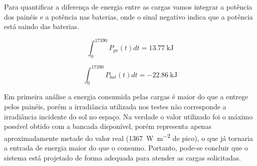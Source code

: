 Para quantificar a diferença de energia entre as cargas vamos integrar a potência dos painéis e a potência nas baterias, onde o sinal negativo indica que a potência está saindo das baterias.

\begin{equation}
\int_{0}^{17390} P_{pv}(t) dt = \SI{13.77}{\kilo\joule}
\end{equation} 

\begin{equation}
\int_{0}^{17390} P_{bat}(t) dt = \SI{-22.86}{\kilo\joule}
\end{equation}

Em primeira análise a energia consumida pelas cargas é maior do que a entrege pelos painéis, porém a irradiância utilizada nos testes não corresponde a irradiância incidente do sol no espaço. Na verdade o valor utilizado foi o máximo possível obtido com a bancada disponível, porém representa apenas aproximadamente metade do valor real (\SI{1367}{\watt\per\square\metre} de pico), o que já tornaria a entrada de energia maior do que o consumo. Portanto, pode-se concluir que o sistema está projetado de forma adequada para atender as cargas solicitadas.